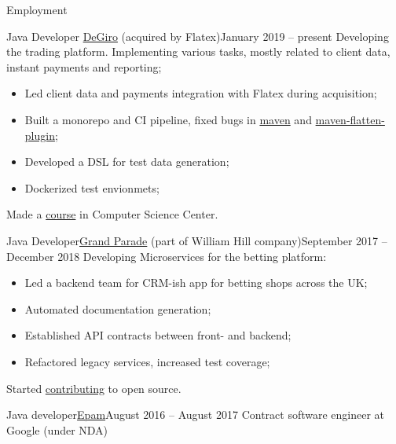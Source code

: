 \documentclass[]{mcdowellcv}
\begin{document}
	\makeheader

	\begin{cvsection}{Employment}
		\begin{cvsubsection}{Java Developer }{\href{https://degiro.nl}{DeGiro} (acquired by Flatex)}{January 2019 -- present}
			Developing the trading platform. Implementing various tasks,
			mostly related to client data, instant payments and reporting;

			\begin{itemize}
				\item Led client data and payments integration with Flatex during acquisition;
				\item Built a monorepo and CI pipeline, fixed bugs in
				\href{https://github.com/apache/maven/pull/347}{maven}
				and  \href{https://github.com/mojohaus/flatten-maven-plugin/pull/152}{maven-flatten-plugin};
				\item Developed a DSL for test data generation;
				\item Dockerized test envionmets;
			\end{itemize}
			Made a \href{https://compscicenter.ru/courses/practical-minimum/}{course} in Computer Science Center.
		\end{cvsubsection}

		\begin{cvsubsection}{Java Developer}{\href{https://grandparade.co.uk/}{Grand Parade} (part of William Hill company)}{September 2017 -- December 2018}
			Developing Microservices for the betting platform:
			\begin{itemize}
				\item Led a backend team for CRM-ish app for betting shops across the UK;
				\item Automated documentation generation;
				\item Established API contracts between front- and backend;
				\item Refactored legacy services, increased test coverage;
			\end{itemize}
			Started \href{https://github.com/apache/ignite/commits?author=dehasi}{contributing} to open source.
		\end{cvsubsection}

		\begin{cvsubsection}{Java developer}{\href{https://www.epam.com/}{Epam}}{August 2016 -- August 2017}
			Contract software engineer at Google (under NDA)
		\end{cvsubsection}


\end{cvsection}
\end{document}
